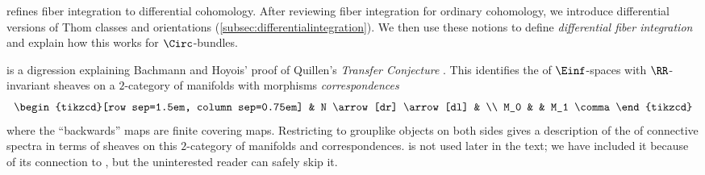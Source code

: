  refines fiber integration to differential cohomology.
After reviewing fiber integration for ordinary cohomology, we introduce differential versions of Thom classes and orientations (\cref{subsec:differentialintegration}).
We then use these notions to define \textit{differential fiber integration} and explain how this works for $ \Circ $-bundles.

 is a digression explaining Bachmann and Hoyois' proof of Quillen's \textit{Transfer Conjecture} \cite[Appendix C]{MotivicNorms:BachmannHoyois}.
This identifies the \category of $ \Einf $-spaces with $ \RR $-invariant sheaves on a $ 2 $-category of manifolds with morphisms \textit{correspondences}
\begin{equation*}
	\begin{tikzcd}[row sep=1.5em, column sep=0.75em]
		& N \arrow[dr] \arrow[dl] & \\
		M_0 & & M_1 \comma
	\end{tikzcd}
\end{equation*}
where the ``backwards'' maps are finite covering maps.
Restricting to grouplike objects on both sides gives a description of the \category of connective spectra in terms of sheaves on this $ 2 $-category of manifolds and correspondences.
 is not used later in the text; we have included it because of its connection to , but the uninterested reader can safely skip it.
